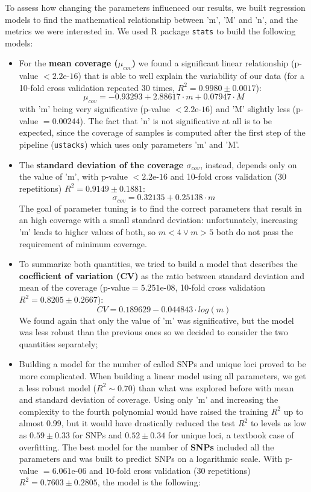 \documentclass[a4paper, 12pt]{report}
\begin{document}
To assess how changing the parameters influenced our results, we built regression models to find the mathematical relationship between 'm', 'M' and 'n', and the metrics we were interested in. We used R package \texttt{stats} to build the following models:
\vspace{-1.5em}
\begin{itemize}\setlength\itemsep{-0.2em}
	\item For the \textbf{mean coverage ($\mu_{cov}$)} we found a significant linear relationship (p-value $< 2.2\text{e-}16$) that is able to well explain the variability of our data (for a 10-fold cross validation repeated 30 times, $R^2 = 0.9980 \pm 0.0017$):
	\begin{equation}
		\mu_{cov} = -0.93293+2.88617\cdot m+0.07947\cdot M
	\end{equation}
	with 'm' being very significative (p-value $< 2.2\text{e-}16$) and 'M' slightly less (p-value $= 0.00244$). The fact that 'n' is not significative at all is to be expected, since the coverage of samples is computed after the first step of the pipeline (\texttt{ustacks}) which uses only parameters 'm' and 'M'.
	\item The \textbf{standard deviation of the coverage $\sigma_{cov}$}, instead, depends only on the value of 'm', with p-value $< 2.2\text{e-}16$ and 10-fold cross validation (30 repetitions) $R^2 = 0.9149 \pm 0.1881$:
	\begin{equation}
		\sigma_{cov} = 0.32135+0.25138\cdot m
	\end{equation}
	The goal of parameter tuning is to find the correct parameters that result in an high coverage with a small standard deviation: unfortunately, increasing 'm' leads to higher values of both, so $m < 4 \vee m > 5$ both do not pass the requirement of minimum coverage.
	\item To summarize both quantities, we tried to build a model that describes the \textbf{coefficient of variation (CV)} as the ratio between standard deviation and mean of the coverage (p-value$=5.251\text{e-}08$, 10-fold cross validation $R^2 = 0.8205 \pm 0.2667$):
	\begin{equation}
		CV = 0.189629 - 0.044843 \cdot log(m)
	\end{equation}
	We found again that only the value of 'm' was significative, but the model was less robust than the previous ones so we decided to consider the two quantities separately;
	\item Building a model for the number of called SNPs and unique loci proved to be more complicated. When building a linear model using all parameters, we get a less robust model ($R^2 \sim 0.70$) than what was explored before with mean and standard deviation of coverage. Using only 'm' and increasing the complexity to the fourth polynomial would have raised the training $R^2$ up to almost 0.99, but it would have drastically reduced the test $R^2$ to levels as low as $0.59 \pm 0.33$ for SNPs and $0.52 \pm 0.34$ for unique loci, a textbook case of overfitting. The best model for the number of \textbf{SNPs} included all the parameters and was built to predict SNPs on a logarithmic scale. With p-value $= 6.061\text{e-}06$ and 10-fold cross validation (30 repetitions) $R^2 = 0.7603 \pm 0.2805$, the model is the following:

\end{itemize}
\end{document}

